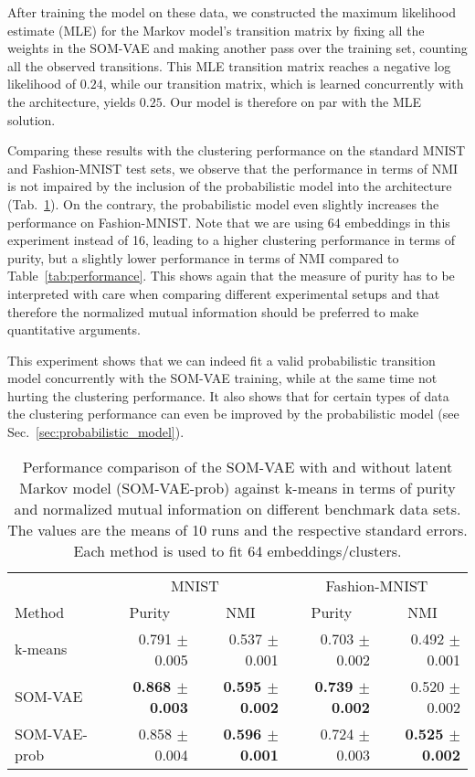 After training the model on these data, we constructed the maximum likelihood estimate (MLE) for the Markov model's transition matrix by fixing all the weights in the SOM-VAE and making another pass over the training set, counting all the observed transitions.
This MLE transition matrix reaches a negative log likelihood of $0.24$, while our transition matrix, which is learned concurrently with the architecture, yields $0.25$.
Our model is therefore on par with the MLE solution.

Comparing these results with the clustering performance on the standard MNIST and Fashion-MNIST test sets, we observe that the performance in terms of NMI is not impaired by the inclusion of the probabilistic model into the architecture (Tab.~\ref{tab:performance_prob}).
On the contrary, the probabilistic model even slightly increases the performance on Fashion-MNIST.
Note that we are using 64 embeddings in this experiment instead of 16, leading to a higher clustering performance in terms of purity, but a slightly lower performance in terms of NMI compared to Table~\ref{tab:performance}.
This shows again that the measure of purity has to be interpreted with care when comparing different experimental setups and that therefore the normalized mutual information should be preferred to make quantitative arguments.

This experiment shows that we can indeed fit a valid probabilistic transition model concurrently with the SOM-VAE training, while at the same time not hurting the clustering performance.
It also shows that for certain types of data the clustering performance can even be improved by the probabilistic model (see Sec.~\ref{sec:probabilistic_model}).

\begin{table}
    \centering
    \caption{Performance comparison of the SOM-VAE with and without latent Markov model (SOM-VAE-prob) against k-means in terms of purity and normalized mutual information on different benchmark data sets. The values are the means of 10 runs and the respective standard errors. Each method is used to fit 64 embeddings/clusters.}
    \begin{tabular}{lrrrr}
        \toprule
         & \multicolumn{2}{c}{MNIST} & \multicolumn{2}{c}{Fashion-MNIST} \\
        \cmidrule(rl){2-3}
        \cmidrule(rl){4-5}
        Method & \multicolumn{1}{c}{Purity} & \multicolumn{1}{c}{NMI} & \multicolumn{1}{c}{Purity} & \multicolumn{1}{c}{NMI} \\
         \midrule
         k-means & 0.791 $\pm$ 0.005 & 0.537 $\pm$ 0.001 & 0.703 $\pm$ 0.002 & 0.492 $\pm$ 0.001 \\
         SOM-VAE & \textbf{0.868 $\pm$ 0.003} & \textbf{0.595 $\pm$ 0.002} & \textbf{0.739 $\pm$ 0.002} & 0.520 $\pm$ 0.002 \\
         SOM-VAE-prob & 0.858 $\pm$ 0.004 & \textbf{0.596 $\pm$ 0.001} & 0.724 $\pm$ 0.003 & \textbf{0.525 $\pm$ 0.002} \\
         \bottomrule
    \end{tabular}
    \label{tab:performance_prob}
\end{table}


